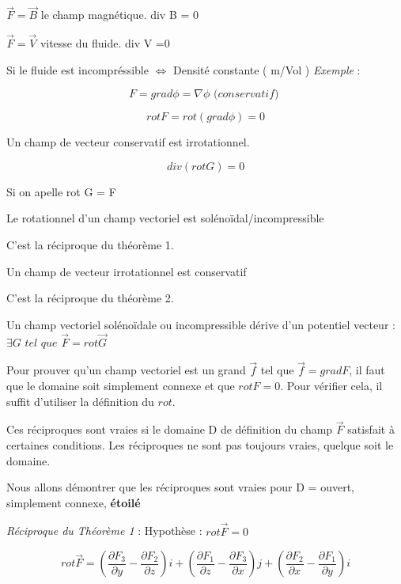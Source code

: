  $\vec F= \vec B$ le champ magnétique. div B = 0

 $\vec F= \vec V$ vitesse du fluide. div V =0

 Si le fluide est incompréssible $\Leftrightarrow$ Densité constante ( m/Vol )
 \textit{
 Exemple} :

 \[F= grad \phi = \nabla \phi \textit{ (conservatif) }\]

 \[rot F = rot ( grad \phi ) =0\]

 \begin{mytheo}
 Un champ de vecteur conservatif est irrotationnel.
 \end{mytheo}

 \[div ( rot G ) = 0\]

 Si on apelle rot G = F

 \begin{mytheo}
 Le rotationnel d'un champ vectoriel est solénoïdal/incompressible
 \end{mytheo}


 \begin{mytheo}
 C'est la réciproque du théorème 1.


 Un champ de vecteur irrotationnel est conservatif
 \end{mytheo}


 \begin{mytheo}
C'est la réciproque du théorème 2.

 Un champ vectoriel solénoïdale ou incompressible dérive d'un potentiel vecteur : $\exists G \textit{ tel que } \vec F = rot \vec G$
 \end{mytheo}
 \begin{myrem}

Pour prouver qu'un champ vectoriel est un grand $\vec f $ tel que $\vec f = grad F$, il faut que le domaine soit simplement connexe et que $rot F=0$. Pour vérifier cela, il suffit d'utiliser la définition du $rot$.

 \end{myrem}
 Ces réciproques sont vraies si le domaine D de définition du champ $\vec F$ satisfait à certaines conditions. Les réciproques ne sont pas toujours vraies, quelque soit le domaine.

 Nous allons démontrer que les réciproques sont vraies pour D = ouvert, simplement connexe, \textbf{étoilé}



 \textit{Réciproque du Théorème 1} : Hypothèse : $rot \vec F =0$

 \[rot \vec F
=\left( \frac{\partial F_3}{\partial y } -  \frac{\partial F_2}{\partial z }\right) i
+\left( \frac{\partial F_1}{\partial z } -  \frac{\partial F_3}{\partial x }\right) j
+\left( \frac{\partial F_2}{\partial x } -  \frac{\partial F_1}{\partial y }\right) i
\]


